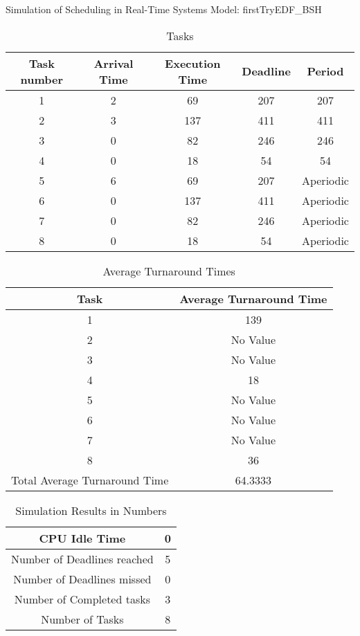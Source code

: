\documentclass[13pt, a4paper, english]{report}
\begin{document}
\begin{center}
\large{Simulation of Scheduling in Real-Time Systems}
\large{Model: firstTryEDF_BSH }
\end{center}
\begin{table}[H]
\caption{Tasks} 
\centering
\begin{tabular}{|c|c|c|c|c|} 
\hline 
Task number & Arrival Time & Execution Time & Deadline & Period \\ \hline 
1&2&69&207&207\\ \hline 
2&3&137&411&411\\ \hline 
3&0&82&246&246\\ \hline 
4&0&18&54&54\\ \hline 
5&6&69&207&Aperiodic\\ \hline 
6&0&137&411&Aperiodic\\ \hline 
7&0&82&246&Aperiodic\\ \hline 
8&0&18&54&Aperiodic\\ \hline 
\end{tabular}
\end{table}
\begin{table}[H]
\caption{Average Turnaround Times} 
\centering
\begin{tabular}{|c|c|} 
\hline 
Task & Average Turnaround Time \\ \hline 
1 & 139\\ \hline 
2 &  No Value \\ \hline 
3 &  No Value \\ \hline 
4 & 18\\ \hline 
5 &  No Value \\ \hline 
6 &  No Value \\ \hline 
7 &  No Value \\ \hline 
8 & 36\\ \hline 
Total Average Turnaround Time &64.3333\\ \hline 
\end{tabular}
\end{table}
\begin{table}[H]
\caption{Simulation Results in Numbers} 
\centering
\begin{tabular}{|c|c|} 
\hline 
CPU Idle Time &0\\ \hline 
Number of Deadlines reached &5\\ \hline 
Number of Deadlines missed &0\\ \hline 
Number of Completed tasks &3 \\ \hline 
Number of Tasks &8\\ \hline 
\end{tabular}
\end{table}
\end{document}
